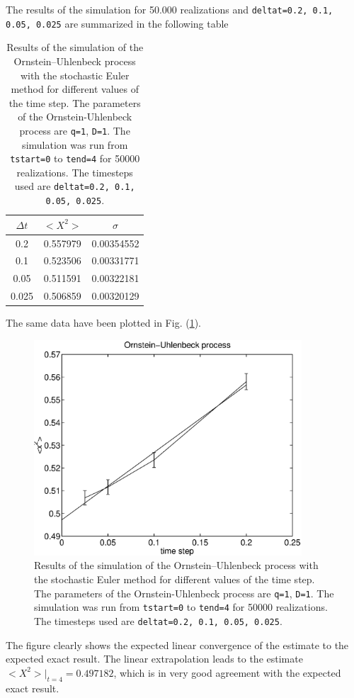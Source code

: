 The results of the simulation for 50.000 realizations 
and \texttt{deltat=0.2, 0.1, 0.05, 0.025} are summarized in the following 
table 
\begin{table}
\caption{Results of the simulation of the Ornstein--Uhlenbeck 
process with the stochastic Euler method for different values of 
the time step. The parameters of the Ornstein-Uhlenbeck process
are \texttt{q=1}, \texttt{D=1}. The simulation was run from
\texttt{tstart=0} to \texttt{tend=4} for 50000 realizations.
The timesteps used are \texttt{deltat=0.2, 0.1, 0.05, 0.025}.}
\begin{center}
\begin{tabular}{|c|c|c|} \hline \hline
$\Delta t$ & $<X^2>$ & $\sigma$ \\ \hline \hline
0.2      & 0.557979 & 0.00354552 \\ \hline
0.1      & 0.523506 & 0.00331771  \\ \hline
0.05     & 0.511591 & 0.00322181  \\ \hline
0.025    & 0.506859 & 0.00320129  \\ \hline \hline
\end{tabular}
\end{center}
\end{table}
The same data have been plotted in Fig. (\ref{F_SDEORN_50}).
\begin{figure}
\label{F_SDEORN_50}
\includegraphics[width=10cm]{../Figures/f_sdeorn_50.eps}
\caption{Results of the simulation of the Ornstein--Uhlenbeck 
process with the stochastic Euler method for different values of 
the time step. The parameters of the Ornstein-Uhlenbeck process
are \texttt{q=1}, \texttt{D=1}. The simulation was run from
\texttt{tstart=0} to \texttt{tend=4} for 50000 realizations.
The timesteps used are \texttt{deltat=0.2, 0.1, 0.05, 0.025}.} 
\end{figure}
The figure clearly shows the expected linear convergence of the 
estimate to the expected exact result. The linear extrapolation 
leads to the estimate $<X^2>|_{t=4}=0.497182$, which is in very 
good agreement with the expected exact result. 

